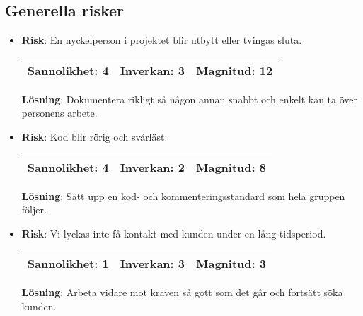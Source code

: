 \subsection{Generella risker}
\begin{itemize}
\item \textbf{Risk}: En nyckelperson i projektet blir utbytt eller tvingas sluta.

\begin{tabular}{ | l | l | l |}
	\hline
	Sannolikhet: 4 & Inverkan: 3 & Magnitud: 12 \\ \hline
\end{tabular}

\textbf{Lösning}: Dokumentera rikligt så någon annan snabbt och enkelt kan ta över personens arbete.
\item \textbf{Risk}: Kod blir rörig och svårläst.

\begin{tabular}{ | l | l | l |}
	\hline
	Sannolikhet: 4 & Inverkan: 2 & Magnitud: 8 \\ \hline
\end{tabular}

\textbf{Lösning}: Sätt upp en kod- och kommenteringsstandard som hela gruppen följer.
\item \textbf{Risk}: Vi lyckas inte få kontakt med kunden under en lång tidsperiod.

\begin{tabular}{ | l | l | l |}
	\hline
	Sannolikhet: 1 & Inverkan: 3 & Magnitud: 3 \\ \hline
\end{tabular}

\textbf{Lösning}: Arbeta vidare mot kraven så gott som det går och fortsätt söka kunden.
\end{itemize}



